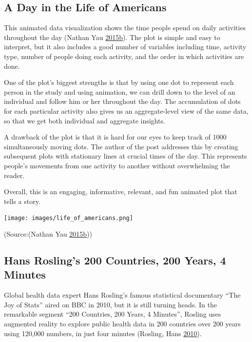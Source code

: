\documentclass[]{book}
\begin{document}
\hypertarget{a-day-in-the-life-of-americans}{%
\subsection{A Day in the Life of Americans}\label{a-day-in-the-life-of-americans}}

This animated data visualization shows the time people spend on daily activities throughout the day (Nathan Yau \protect\hyperlink{ref-American_life}{2015}\protect\hyperlink{ref-American_life}{b}). The plot is simple and easy to interpret, but it also includes a good number of variables including time, activity type, number of people doing each activity, and the order in which activities are done.

One of the plot's biggest strengths is that by using one dot to represent each person in the study and using animation, we can drill down to the level of an individual and follow him or her throughout the day. The accumulation of dots for each particular activity also gives us an aggregate-level view of the same data, so that we get both individual and aggregate insights.

A drawback of the plot is that it is hard for our eyes to keep track of 1000 simultaneously moving dots. The author of the post addresses this by creating subsequent plots with stationary lines at crucial times of the day. This represents people's movements from one activity to another without overwhelming the reader.

Overall, this is an engaging, informative, relevant, and fun animated plot that tells a story.

\texttt{[image: images/life\_of\_americans.png]}

(Source:(Nathan Yau \protect\hyperlink{ref-American_life}{2015}\protect\hyperlink{ref-American_life}{b}))

\hypertarget{hans-roslings-200-countries-200-years-4-minutes}{%
\subsection{Hans Rosling's 200 Countries, 200 Years, 4 Minutes}\label{hans-roslings-200-countries-200-years-4-minutes}}

Global health data expert Hans Rosling's famous statistical documentary ``The Joy of Stats'' aired on BBC in 2010, but it is still turning heads. In the remarkable segment ``200 Countries, 200 Years, 4 Minutes'', Rosling uses augmented reality to explore public health data in 200 countries over 200 years using 120,000 numbers, in just four minutes (Rosling, Hans \protect\hyperlink{ref-hans_rosling}{2010}).
\end{document}
